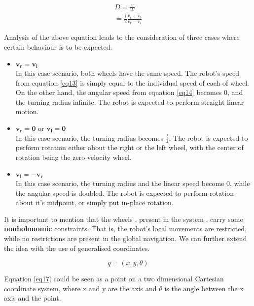 \begin{align}
D = \frac{v}{W} \label{eq16} \\
= \frac{l}{2}\frac{v_r + v_l}{v_r - v_l} \nonumber
\end{align}

Analysis of the above equation leads to the consideration of three cases where certain behaviour is to be expected.

\begin{itemize} \label{list_v}

\item $\boldsymbol{v_r = v_l}$ \\ In this case scenario, both wheels have the same speed. The robot's speed from equation \ref{eq13} is simply equal to the individual speed of each of wheel. On the other hand, the angular speed from equation \ref{eq14} becomes 0, and the turning radius infinite. The robot is expected to perform straight linear motion.

\item $\boldsymbol{v_r = 0}$ or $\boldsymbol{v_l = 0}$ \\ In this case scenario, the turning radius becomes $\frac{l}{2}$. The robot is expected to perform rotation either about the right or the left wheel, with the center of rotation being the zero velocity wheel. 

\item $\boldsymbol{v_l = -v_r}$ \\ In this case scenario, the turning radius and the linear speed become 0, while the angular speed is doubled. The robot is expected to perform rotation about it's midpoint, or simply put in-place rotation.

\end{itemize}

It is important to mention that the wheels , present in the system , carry some \textbf{nonholonomic} constraints. That is, the robot's local movements are restricted, while no restrictions are present in the global navigation. We can further extend the idea with the use of generalised coordinates.

\begin{equation} \label{eq17}
q = (x,y,\theta) 
\end{equation}

Equation \ref{eq17} could be seen as a point on a two dimensional Cartesian coordinate system, where x and y are the axis and $\theta$ is the angle between the x axis and the point. 

